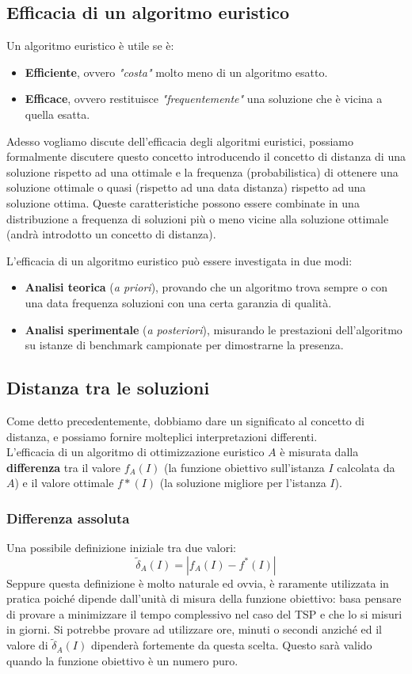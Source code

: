 \documentclass{article}
\begin{document}
\subsection{Efficacia di un algoritmo euristico}
Un algoritmo euristico è utile se è:
\begin{itemize}
    \item \textbf{Efficiente}, ovvero \textit{"costa"} molto meno di un algoritmo esatto.
    \item \textbf{Efficace}, ovvero restituisce \textit{"frequentemente"} una soluzione
          che è vicina a quella esatta.
\end{itemize}

Adesso vogliamo discute dell'efficacia degli algoritmi euristici, possiamo formalmente discutere
questo concetto introducendo il concetto di distanza di una soluzione rispetto ad una ottimale e la
frequenza (probabilistica) di ottenere una soluzione ottimale o quasi (rispetto ad una data distanza)
rispetto ad una soluzione ottima.
Queste caratteristiche possono essere combinate in una distribuzione a frequenza di soluzioni
più o meno vicine alla soluzione ottimale (andrà introdotto un concetto di distanza).

L'efficacia di un algoritmo euristico può essere investigata in due modi:
\begin{itemize}
    \item \textbf{Analisi teorica} (\textit{a priori}), provando che un algoritmo trova
          sempre o con una data frequenza soluzioni con una certa garanzia di qualità.
    \item \textbf{Analisi sperimentale} (\textit{a posteriori}), misurando le prestazioni dell'algoritmo
          su istanze di benchmark campionate per dimostrarne la presenza.
\end{itemize}

\subsection{Distanza tra le soluzioni}
Come detto precedentemente, dobbiamo dare un significato al concetto di distanza, e possiamo fornire
molteplici interpretazioni differenti.\\L'efficacia di un algoritmo di ottimizzazione euristico $A$
è misurata dalla \textbf{differenza} tra il valore $f_A(I)$ (la funzione obiettivo sull'istanza
$I$ calcolata da $A$) e il valore ottimale $f*(I)$ (la soluzione migliore per l'istanza $I$).

\subsubsection{Differenza assoluta}
Una possibile definizione iniziale tra due valori:
$$\widetilde{\delta}_A(I)=|f_A(I)-f^{*}(I)|$$
Seppure questa definizione è molto naturale ed ovvia, è raramente utilizzata in pratica poiché dipende
dall'unità di misura della funzione obiettivo: basa pensare di provare a minimizzare il tempo complessivo
nel caso del TSP e che lo si misuri in giorni. Si potrebbe provare ad utilizzare ore, minuti o secondi
anziché ed il valore di $\widetilde{\delta}_A(I)$ dipenderà fortemente da questa scelta. Questo sarà
valido quando la funzione obiettivo è un numero puro.
\end{document}
